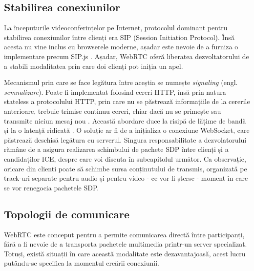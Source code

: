 \subsection{Stabilirea conexiunilor}
\label{sec:ch3sec1subsec1}
\indent \par La începuturile videoconferințelor pe Internet, protocolul dominant pentru stabilirea conexiunilor între clienți era SIP (Session Initiation Protocol). Însă acesta nu vine inclus cu browserele moderne, așadar este nevoie de a furniza o implementare precum SIP.js \cite{WebNSM2017}. Așadar, WebRTC oferă liberatea dezvoltatorului de a stabili modalitatea prin care doi clienți pot iniția un apel. 
\indent \par Mecanismul prin care se face legătura între aceștia se numește \textit{signaling} (engl. \textit{semnalizare}). Poate fi implementat folosind cereri HTTP, însă prin natura stateless a protocolului HTTP, prin care nu se păstrează informațiile de la cererile anterioare, trebuie trimise continuu cereri, chiar dacă nu se primește sau transmite niciun mesaj nou \cite{WebNSM2017}. Această abordare duce la risipă de lățime de bandă și la o latență ridicată \cite{WebNSM2017}. O soluție ar fi de a inițializa o conexiune WebSocket, care păstrează deschisă legătura cu serverul. Singura responsabilitate a dezvolatorului rămâne de a asigura realizarea schimbului de pachete SDP între clienți și a candidaților ICE, despre care voi discuta în subcapitolul următor. Ca observație, oricare din clienți poate să schimbe sursa conținutului de transmis, organizată pe track-uri separate pentru audio și pentru video - ce vor fi șterse - moment în care se vor renegocia pachetele SDP.

\subsection{Topologii de comunicare}
\label{sec:ch3sec1subsec2}
\indent \par WebRTC este conceput pentru a permite comunicarea directă între participanți, fără a fi nevoie de a transporta pachetele multimedia printr-un server specializat. Totuși, există situații în care această modalitate este dezavantajoasă, acest lucru putându-se specifica la momentul creării conexiunii.
